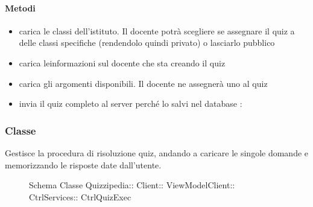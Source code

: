 \paragraph{Metodi}
\begin{itemize}
\item {}
\newline
carica le classi dell'istituto. Il docente potrà scegliere se assegnare il quiz a delle classi specifiche (rendendolo quindi privato) o lasciarlo pubblico
\newline
\item {}
\newline
carica leinformazioni sul docente che sta creando il quiz
\newline
\item {}
\newline
carica gli argomenti disponibili. Il docente ne assegnerà uno al quiz
\newline
\item {}
\newline
invia il quiz completo al server perché lo salvi nel database
\newline
{} :
\end{itemize}
\subsubsection{Classe }
Gestisce la procedura di risoluzione quiz, andando a caricare le singole domande e memorizzando le risposte date dall'utente.
\begin{figure}[H]
\centering
\noindent{}
\caption[Schema Classe CtrlQuizExec]{Schema Classe Quizzipedia:: Client:: ViewModelClient:: CtrlServices:: CtrlQuizExec}
\end{figure}
